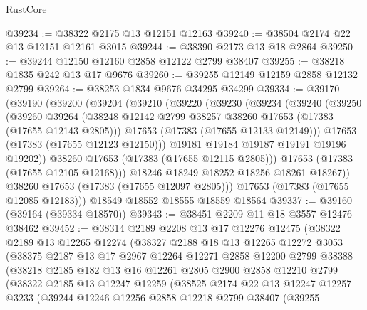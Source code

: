 \begin{lexlean}{RustCore}
\begin{coremodule}
@39234 := @38322 @2175 @13 @12151 @12163
@39240 := @38504 @2174 @22 @13 @12151 @12161 @3015
@39244 := @38390 @2173 @13 @18 @2864
@39250 := @39244 @12150 @12160 @2858 @12122 @2799 @38407
@39255 := @38218 @1835 @242 @13 @17 @9676
@39260 := @39255 @12149 @12159 @2858 @12132 @2799
@39264 := @38253 @1834 @9676 @34295 @34299
@39334 := @39170
    (@39190
      (@39200
        (@39204
          (@39210
            (@39220
              (@39230
                (@39234
                  (@39240
                    (@39250
                      (@39260
                        @39264
                        (@38248 @12142 @2799 @38257 @38260 @17653 (@17383 (@17655 @12143 @2805)))
                        @17653
                        (@17383 (@17655 @12133 @12149)))
                      @17653
                      (@17383 (@17655 @12123 @12150)))
                    @19181
                    @19184
                    @19187
                    @19191
                    @19196
                    @19202))
                @38260
                @17653
                (@17383 (@17655 @12115 @2805)))
              @17653
              (@17383 (@17655 @12105 @12168)))
            @18246
            @18249
            @18252
            @18256
            @18261
            @18267))
        @38260
        @17653
        (@17383 (@17655 @12097 @2805)))
      @17653
      (@17383 (@17655 @12085 @12183)))
    @18549
    @18552
    @18555
    @18559
    @18564
@39337 := @39160 (@39164 (@39334 @18570))
@39343 := @38451 @2209 @11 @18 @3557 @12476 @38462
@39452 := @38314
    @2189
    @2208
    @13
    @17
    @12276
    @12475
    (@38322
      @2189
      @13
      @12265
      @12274
      (@38327
        @2188
        @18
        @13
        @12265
        @12272
        @3053
        (@38375
          @2187
          @13
          @17
          @2967
          @12264
          @12271
          @2858
          @12200
          @2799
          @38388
          (@38218
            @2185
            @182
            @13
            @16
            @12261
            @2805
            @2900
            @2858
            @12210
            @2799
            (@38322
              @2185
              @13
              @12247
              @12259
              (@38525
                @2174
                @22
                @13
                @12247
                @12257
                @3233
                (@39244
                  @12246
                  @12256
                  @2858
                  @12218
                  @2799
                  @38407
                  (@39255

\end{coremodule}
\end{lexlean}
